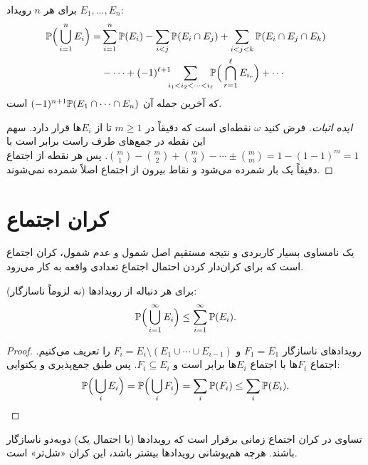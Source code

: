 \begin{theorem}
برای هر $n$ رویداد $E_1,\ldots,E_n$:
\[
\begin{aligned}
\mathbb{P}\Big(\bigcup_{i=1}^{n}E_i\Big)=&\sum_{i=1}^{n}\mathbb{P}(E_i)-\sum_{i<j}\mathbb{P}(E_i\cap E_j)+\sum_{i<j<k}\mathbb{P}(E_i\cap E_j\cap E_k)\\
&-\cdots+(-1)^{\ell+1}\!\!\!\sum_{i_1<i_2<\cdots<i_\ell}\!\!\!\mathbb{P}\Big(\bigcap_{r=1}^{\ell}E_{i_r}\Big)+\cdots
\end{aligned}
\]
که آخرین جمله آن $(-1)^{n+1}\mathbb{P}(E_1\cap\cdots\cap E_n)$ است.
\end{theorem}
\begin{proof}[ایده اثبات]
فرض کنید $\omega$ نقطه‌ای است که دقیقاً در $m\ge1$ تا از $E_i$ها قرار دارد. سهم این نقطه در جمع‌های طرف راست برابر است با
$\binom m1-\binom m2+\binom m3-\cdots\pm\binom mm=1-(1-1)^m=1$.
پس هر نقطه از اجتماع دقیقاً یک بار شمرده می‌شود و نقاط بیرون از اجتماع اصلاً شمرده نمی‌شوند.
\end{proof}

\section{کران اجتماع }

یک نامساوی بسیار کاربردی و نتیجه مستقیم اصل شمول و عدم شمول، کران اجتماع است که برای کران‌دار کردن احتمال اجتماع تعدادی واقعه به کار می‌رود.

\begin{theorem}
برای هر دنباله از رویدادها (نه لزوماً ناسازگار):
\[\mathbb{P}\Big(\bigcup_{i=1}^{\infty}E_i\Big)\le\sum_{i=1}^{\infty}\mathbb{P}(E_i).\]
\end{theorem}
\begin{proof}
رویدادهای ناسازگار $F_1=E_1$ و $F_i=E_i\setminus(E_1\cup\cdots\cup E_{i-1})$ را تعریف می‌کنیم. اجتماع $F_i$ها با اجتماع $E_i$ها برابر است و $F_i\subseteq E_i$. پس طبق جمع‌پذیری و یکنوایی:
\[\mathbb{P}\Big(\bigcup_i E_i\Big)=\mathbb{P}\Big(\bigcup_i F_i\Big)=\sum_i\mathbb{P}(F_i)\le\sum_i\mathbb{P}(E_i).\]
\end{proof}

\begin{note}
\notetitle تساوی در کران اجتماع زمانی برقرار است که رویدادها (با احتمال یک) دوبه‌دو ناسازگار باشند. هرچه هم‌پوشانی رویدادها بیشتر باشد، این کران «شل‌تر» است.
\end{note}


